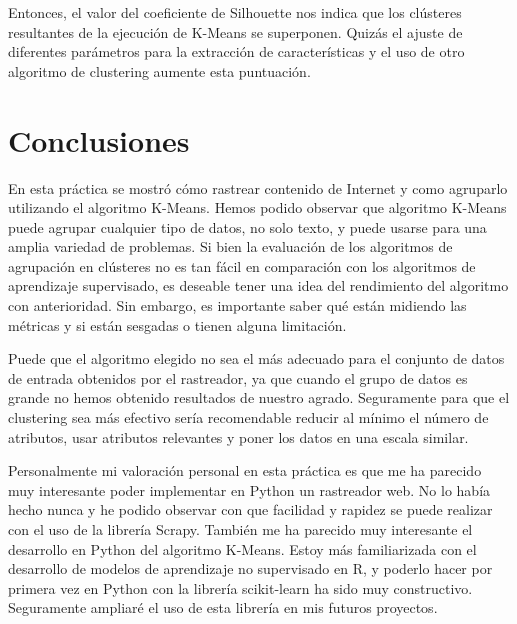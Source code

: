 \documentclass{uimppracticas}
\begin{document}
Entonces, el valor del coeficiente de Silhouette nos indica que los clústeres resultantes de la ejecución de K-Means se superponen. Quizás el ajuste de diferentes parámetros para la extracción de características y el uso de otro algoritmo de clustering aumente esta puntuación.

\section{Conclusiones}

En esta práctica se mostró cómo rastrear contenido de Internet y como agruparlo utilizando el algoritmo K-Means. Hemos podido observar que algoritmo K-Means puede agrupar cualquier tipo de datos, no solo texto, y puede usarse para una amplia variedad de problemas. Si bien la evaluación de los algoritmos de agrupación en clústeres no es tan fácil en comparación con los algoritmos de aprendizaje supervisado, es deseable tener una idea del rendimiento del algoritmo con anterioridad. Sin embargo, es importante saber qué están midiendo las métricas y si están sesgadas o tienen alguna limitación. 

Puede que el algoritmo elegido no sea el más adecuado para el conjunto de datos de entrada obtenidos por el rastreador, ya que cuando el grupo de datos es grande no hemos obtenido resultados de nuestro agrado. Seguramente para que el clustering sea más efectivo sería recomendable reducir al mínimo el número de atributos, usar atributos relevantes y poner los datos en una escala similar.

Personalmente mi valoración personal en esta práctica es que me ha parecido muy interesante poder implementar en Python un rastreador web. No lo había hecho nunca y he podido observar con que facilidad y rapidez se puede realizar con el uso de la librería Scrapy. También me ha parecido muy interesante el desarrollo en Python del algoritmo K-Means. Estoy más familiarizada con el desarrollo de modelos de aprendizaje no supervisado en R, y poderlo hacer por primera vez en Python con la librería scikit-learn ha sido muy constructivo. Seguramente ampliaré el uso de esta librería en mis futuros proyectos.

\renewcommand{\refname}{Bibliografía}


\end{document}
